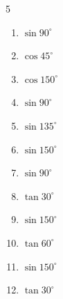 \begin{multicols}{5}
\begin{enumerate}

  \item $\displaystyle \sin{90^\circ}$

        \phantom{$\displaystyle =1$}

  \item $\displaystyle \cos{45^\circ}$


  \item $\displaystyle \cos{150^\circ}$


  \item $\displaystyle \sin{90^\circ}$

        \phantom{$\displaystyle =1$}

  \item $\displaystyle \sin{135^\circ}$


  \item $\displaystyle \sin{150^\circ}$


  \item $\displaystyle \sin{90^\circ}$

        \phantom{$\displaystyle =1$}

  \item $\displaystyle \tan{30^\circ}$


  \item $\displaystyle \sin{150^\circ}$


  \item $\displaystyle \tan{60^\circ}$


  \item $\displaystyle \sin{150^\circ}$


  \item $\displaystyle \tan{30^\circ}$


\columnbreak %


\end{enumerate}
\end{multicols}
